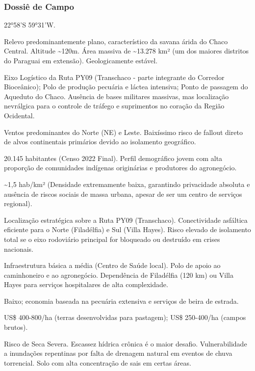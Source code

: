 \subsubsection{Dossiê de Campo}
\begin{description}[style=nextline,leftmargin=0.5cm,font=\bfseries]
\item[Coordenadas]  22°58'S 59°31'W.
\item[Topografia]  Relevo predominantemente plano, característico da savana árida do Chaco Central. Altitude \textasciitilde 120m. Área massiva de \textasciitilde 13.278 km² (um dos maiores distritos do Paraguai em extensão). Geologicamente estável.
\item[Alvos Estratégicos]  Eixo Logístico da Ruta PY09 (Transchaco - parte integrante do Corredor Bioceânico); Polo de produção pecuária e láctea intensiva; Ponto de passagem do Aqueduto do Chaco. Ausência de bases militares massivas, mas localização nevrálgica para o controle de tráfego e suprimentos no coração da Região Ocidental.
\item[Fallout]  Ventos predominantes do Norte (NE) e Leste. Baixíssimo risco de fallout direto de alvos continentais primários devido ao isolamento geográfico.
\item[População]  20.145 habitantes (Censo 2022 Final). Perfil demográfico jovem com alta proporção de comunidades indígenas originárias e produtores do agronegócio.
\item[Densidade]  \textasciitilde 1,5 hab/\allowbreak km² (Densidade extremamente baixa, garantindo privacidade absoluta e ausência de riscos sociais de massa urbana, apesar de ser um centro de serviços regional).
\item[Vias de Acesso]  Localização estratégica sobre a Ruta PY09 (Transchaco). Conectividade asfáltica eficiente para o Norte (Filadélfia) e Sul (Villa Hayes). Risco elevado de isolamento total se o eixo rodoviário principal for bloqueado ou destruído em crises nacionais.
\item[Serviços]  Infraestrutura básica a média (Centro de Saúde local). Polo de apoio ao caminhoneiro e ao agronegócio. Dependência de Filadélfia (120 km) ou Villa Hayes para serviços hospitalares de alta complexidade.
\item[Custo de Vida]  Baixo; economia baseada na pecuária extensiva e serviços de beira de estrada.
\item[Preço da Terra]  US\$ 400-800/\allowbreak ha (terras desenvolvidas para pastagem); US\$ 250-400/\allowbreak ha (campos brutos).
\item[Hidrologia]  Risco de Seca Severa. Escassez hídrica crônica é o maior desafio. Vulnerabilidade a inundações repentinas por falta de drenagem natural em eventos de chuva torrencial. Solo com alta concentração de sais em certas áreas.

\end{description}
